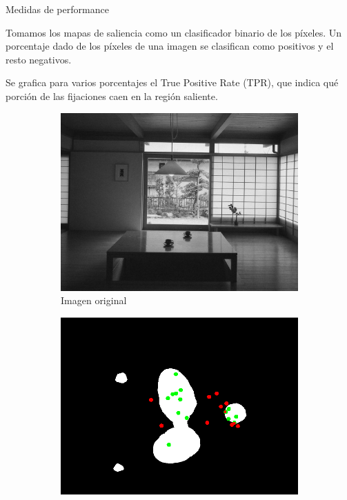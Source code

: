 \documentclass[compress]{beamer}
\begin{document}
\begin{frame}{Medidas de performance}

\begin{itemize}
{\small 
\item Tomamos los mapas de saliencia como un clasificador binario de los píxeles. Un porcentaje dado de los píxeles de una imagen se clasifican como positivos y el resto negativos.
\item Se grafica para varios porcentajes el True Positive Rate (TPR), que indica qué porción de las fijaciones caen en la región saliente.
}
\end{itemize}

\begin{figure}[b]
    \centering
    \begin{subfigure}[t]{0.3\textwidth}
        \centering
        \includegraphics[width=\linewidth]{images/grayscale_100_oliva.jpg}
        \caption{\footnotesize Imagen original} \label{fig:grayscale_100_oliva}
    \end{subfigure}
    \hfill
    \begin{subfigure}[t]{0.3\textwidth}
        \centering
        \includegraphics[width=\linewidth]{images/example-salient-percent-8-14.png} 

\end{subfigure}
\end{figure}
\end{frame}
\end{document}
